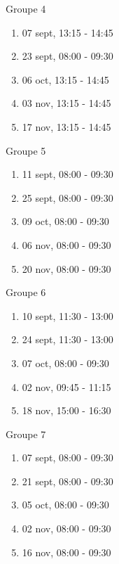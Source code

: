 \documentclass[
  a4paper,
  DIV=11,
  numbers=noendperiod,
  oneside]{scrreprt}
\providecommand{\tightlist}{%
  \setlength{\itemsep}{0pt}\setlength{\parskip}{0pt}}\usepackage{longtable,booktabs,array}
\begin{document}
Groupe 4

\begin{enumerate}
\def\labelenumi{\arabic{enumi}.}
\tightlist
\item
  07 sept, 13:15 - 14:45
\item
  23 sept, 08:00 - 09:30
\item
  06 oct, 13:15 - 14:45
\item
  03 nov, 13:15 - 14:45
\item
  17 nov, 13:15 - 14:45
\end{enumerate}

Groupe 5

\begin{enumerate}
\def\labelenumi{\arabic{enumi}.}
\tightlist
\item
  11 sept, 08:00 - 09:30
\item
  25 sept, 08:00 - 09:30
\item
  09 oct, 08:00 - 09:30
\item
  06 nov, 08:00 - 09:30
\item
  20 nov, 08:00 - 09:30
\end{enumerate}

Groupe 6

\begin{enumerate}
\def\labelenumi{\arabic{enumi}.}
\tightlist
\item
  10 sept, 11:30 - 13:00
\item
  24 sept, 11:30 - 13:00
\item
  07 oct, 08:00 - 09:30
\item
  02 nov, 09:45 - 11:15
\item
  18 nov, 15:00 - 16:30
\end{enumerate}

Groupe 7

\begin{enumerate}
\def\labelenumi{\arabic{enumi}.}
\tightlist
\item
  07 sept, 08:00 - 09:30
\item
  21 sept, 08:00 - 09:30
\item
  05 oct, 08:00 - 09:30
\item
  02 nov, 08:00 - 09:30
\item
  16 nov, 08:00 - 09:30
\end{enumerate}
\end{document}
